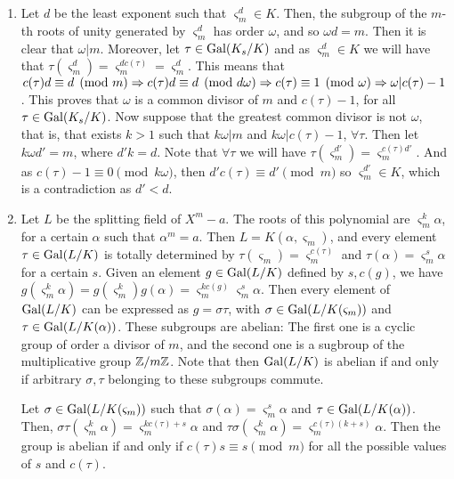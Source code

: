\begin{sol}
	\begin{enumerate}[label=\alph*)]
		\item Let $d$ be the least exponent such that $\varsigma_m^d \in K$. Then, the subgroup of the $m$-th roots of unity generated by $\varsigma_m^d$ has order $\omega$, and so $\omega d = m$. Then it is clear that $\omega | m$. Moreover, let $\tau \in \mathrm{Gal}(K_s/K)$ and as $\varsigma_m^d \in K$ we will have that $\tau(\varsigma_m^d) = \varsigma_m^{dc(\tau)} = \varsigma_m^d$. This means that $c(\tau)d \equiv d \pmod{m} \Rightarrow c(\tau)d \equiv d \pmod{d \omega} \Rightarrow c(\tau) \equiv 1 \pmod{\omega} \Rightarrow \omega | c(\tau)-1$. This proves that $\omega$ is a common divisor of $m$ and $c(\tau)-1$, for all $\tau \in \mathrm{Gal}(K_s/K)$. Now suppose that the greatest common divisor is not $\omega$, that is, that exists $k > 1$ such that $k\omega | m$ and $k\omega |c(\tau)-1$,  $\forall \tau$. Then let $k\omega d' = m$, where $d'k = d$. Note that $\forall \tau$ we will have $\tau(\varsigma_m^{d'}) = \varsigma_m^{c(\tau)d'}$. And as $c(\tau)-1 \equiv 0 \pmod{k\omega}$, then $d'c(\tau) \equiv d' \pmod{m}$ so $\varsigma_m^{d'} \in K$, which is a contradiction as $d' < d$. 

		\item Let $L$ be the splitting field of $X^m -a$. The roots of this polynomial are $\varsigma^k_m \alpha$, for a certain $\alpha$ such that $\alpha^m = a$. Then $L = K(\alpha, \varsigma_m)$, and every element $\tau \in \mathrm{Gal}(L/K)$ is totally determined by $\tau(\varsigma_m) = \varsigma_m^{c(\tau)}$ and $\tau(\alpha) = \varsigma_m^s \alpha$ for a certain $s$. Given an element $g \in \mathrm{Gal}(L/K)$ defined by $s,c(g)$, we have $g(\varsigma_m^k \alpha) =  g(\varsigma_m^k)g(\alpha) = \varsigma_m^{kc(g)}\varsigma_m^s \alpha$. Then every element of $\mathrm{Gal}(L/K)$ can be expressed as $g = \sigma \tau$, with $\sigma \in \mathrm{Gal}(L/K(\varsigma_m))$ and $\tau \in \mathrm{Gal}(L/K(\alpha))$. These subgroups are abelian: The first one is a cyclic group of order a divisor of $m$, and the second one is a sugbroup of the multiplicative group $\mathbb{Z}/m\mathbb{Z}$. Note that then $\mathrm{Gal}(L/K)$ is abelian if and only if arbitrary $\sigma, \tau$ belonging to these subgroups commute.

		Let $\sigma \in \mathrm{Gal}(L/K(\varsigma_m))$ such that $\sigma(\alpha) = \varsigma_m^s \alpha$ and $\tau \in \mathrm{Gal}(L/K(\alpha))$. Then, $\sigma \tau (\varsigma_m^k \alpha) = \varsigma_m^{kc(\tau) + s} \alpha$ and $\tau \sigma (\varsigma_m^k \alpha) = \varsigma_m^{c(\tau)(k + s)} \alpha$. Then the group is abelian if and only if $c(\tau)s \equiv s \pmod{m}$ for all the possible values of $s$ and $c(\tau)$.


\end{enumerate}
\end{sol}
